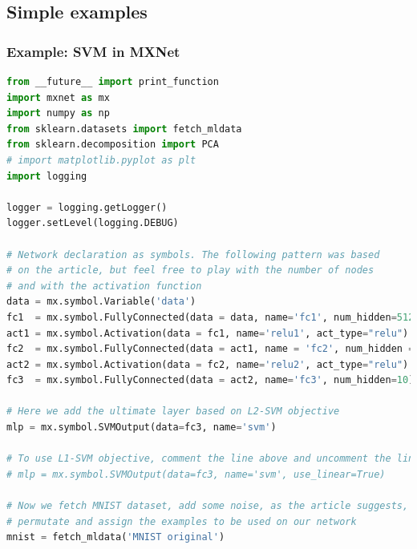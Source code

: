 \subsection{Simple examples}

\begin{frame}[fragile]
  \MyLogo
  \frametitle{Example: SVM in MXNet}  

\begin{lstlisting}[language=python]
from __future__ import print_function
import mxnet as mx
import numpy as np
from sklearn.datasets import fetch_mldata
from sklearn.decomposition import PCA
# import matplotlib.pyplot as plt
import logging

logger = logging.getLogger()
logger.setLevel(logging.DEBUG)

# Network declaration as symbols. The following pattern was based
# on the article, but feel free to play with the number of nodes
# and with the activation function
data = mx.symbol.Variable('data')
fc1  = mx.symbol.FullyConnected(data = data, name='fc1', num_hidden=512)
act1 = mx.symbol.Activation(data = fc1, name='relu1', act_type="relu")
fc2  = mx.symbol.FullyConnected(data = act1, name = 'fc2', num_hidden = 512)
act2 = mx.symbol.Activation(data = fc2, name='relu2', act_type="relu")
fc3  = mx.symbol.FullyConnected(data = act2, name='fc3', num_hidden=10)

# Here we add the ultimate layer based on L2-SVM objective
mlp = mx.symbol.SVMOutput(data=fc3, name='svm')

# To use L1-SVM objective, comment the line above and uncomment the line below
# mlp = mx.symbol.SVMOutput(data=fc3, name='svm', use_linear=True)

# Now we fetch MNIST dataset, add some noise, as the article suggests,
# permutate and assign the examples to be used on our network
mnist = fetch_mldata('MNIST original')
\end{lstlisting}

\end{frame}

